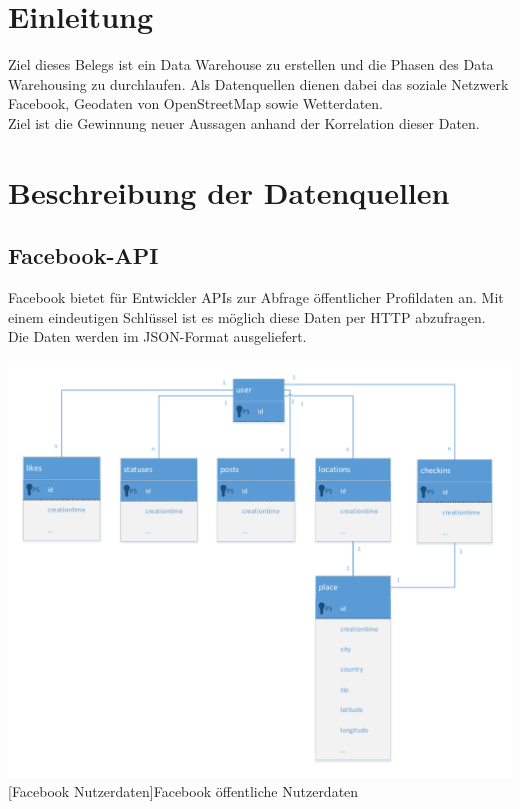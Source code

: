 \documentclass[a4paper,12pt]{scrartcl}
\makeatletter
\def\ScaleIfNeeded{%
\ifdim\Gin@nat@width>\linewidth
\linewidth
\else
\Gin@nat@width
\fi
}
\makeatother
\begin{document}

\tableofcontents

\clearpage

\onehalfspacing


\clearpage
\listoffigures

\clearpage
\section{Einleitung}
Ziel dieses Belegs ist ein Data Warehouse zu erstellen und die Phasen des Data Warehousing zu durchlaufen. Als Datenquellen dienen dabei das soziale Netzwerk Facebook, Geodaten von OpenStreetMap sowie Wetterdaten.\\
Ziel ist die Gewinnung neuer Aussagen anhand der Korrelation dieser Daten.

\clearpage
\section{Beschreibung der Datenquellen}

\subsection{Facebook-API}

Facebook bietet für Entwickler APIs zur Abfrage öffentlicher Profildaten an.
Mit einem eindeutigen Schlüssel ist es möglich diese Daten per HTTP abzufragen.\\
Die Daten werden im JSON-Format ausgeliefert.

\begin{center}
\centering
\includegraphics[width=\ScaleIfNeeded]{../user.pdf}%
[Facebook Nutzerdaten]{Facebook öffentliche Nutzerdaten}%
\end{center}
\end{document}

